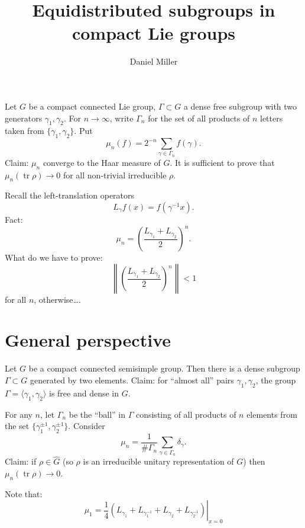 \documentclass{article}
\title{Equidistributed subgroups in compact Lie groups}
\author{Daniel Miller}
\DeclareMathOperator{\tr}{tr}
\begin{document}
\maketitle





Let $G$ be a compact connected Lie group, $\Gamma\subset G$ a dense free 
subgroup with two generators $\gamma_1,\gamma_2$. For $n\to \infty$, write 
$\Gamma_n$ for the set of all products of $n$ letters taken from 
$\{\gamma_1,\gamma_2\}$. Put 
\[
	\mu_n(f) = 2^{-n} \sum_{\gamma\in \Gamma_n} f(\gamma) .
\]
Claim: $\mu_n$ converge to the Haar measure of $G$. It is sufficient to prove 
that $\mu_n(\tr\rho) \to 0$ for all non-trivial irreducible $\rho$. 

Recall the left-translation operators 
\[
	L_\gamma f(x) = f(\gamma^{-1} x). 
\]
Fact: 
\[
	\mu_n = \left(\frac{L_{\gamma_1} + L_{\gamma_2}}{2}\right)^n .
\]
What do we have to prove: 
\[
	\left\| \left( \frac{L_{\gamma_1} + L_{\gamma_2}}{2}\right)^n\right\| < 1
\]
for all $n$, otherwise\ldots. 





\section{General perspective}

Let $G$ be a compact connected semisimple group. Then there is a dense subgroup 
$\Gamma\subset G$ generated by two elements. Claim: for ``almost all'' pairs 
$\gamma_1,\gamma_2$, the group $\Gamma=\langle \gamma_1,\gamma_2\rangle$ is 
free and dense in $G$. 

For any $n$, let $\Gamma_n$ be the ``ball'' in $\Gamma$ consisting of all 
products of $n$ elements from the set $\{\gamma_1^{\pm 1}, \gamma_2^{\pm 1}\}$. 
Consider 
\[
	\mu_n = \frac{1}{\# \Gamma_n} \sum_{\gamma\in \Gamma_n} \delta_\gamma .
\]
Claim: if $\rho\in \widehat G$ (so $\rho$ is an irreducible unitary 
representation of $G$) then $\mu_n(\tr\rho) \to 0$. 

Note that: 
\[
	\mu_1 = \left.\frac 1 4 \left( L_{\gamma_1}+ L_{\gamma_1^{-1}} + L_{\gamma_2} + L_{\gamma_2^{-1}}\right) \right|_{x = 0}
\]
\end{document}
